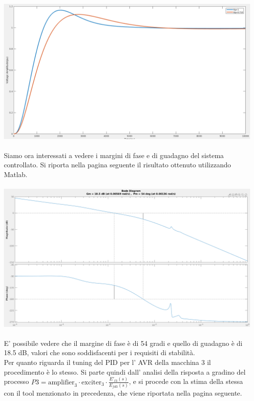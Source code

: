 \documentclass[Lau,noexaminfo]{sapthesis}
\begin{document}
	\includegraphics[scale=0.33,angle=90]{step_k_modificato}\\\\
	Siamo ora interessati a vedere i margini di fase e di guadagno del sistema controllato. Si riporta nella pagina seguente il risultato ottenuto utilizzando Matlab.\\\\
	\includegraphics[scale=1.11]{margin_P2}\\\\
	E' possibile vedere che il margine di fase è di 54 gradi e quello di guadagno è di 18.5 dB, valori che sono soddisfacenti per i requisiti di stabilità.\\
	Per quanto riguarda il tuning del PID per l' AVR della macchina 3 il procedimento è lo stesso. Si parte quindi dall' analisi della risposta a gradino del processo $P3=\text{amplifier}_3\cdot\text{exciter}_3\cdot \frac{E'_{t3}(s)}{E_{fd3}(s)}$, e si procede con la stima della stessa con il tool menzionato in precedenza, che viene riportata nella pagina seguente.\vfill
\end{document}
